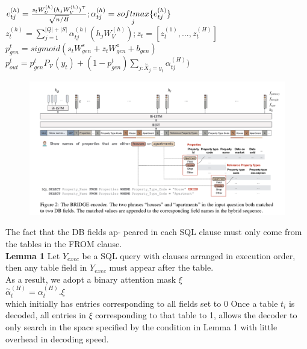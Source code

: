\documentclass[10pt,a4paper]{article}
\begin{document}
\begin{center}
$e_{tj}^{(h)} = \frac{s_{t}W^{(h)}_{U}(h_{j}W^{(h)}_{V})^\top}{\sqrt{n/H}};\space \alpha_{tj}^{(h)}=\underset{j}{softmax}\{e_{tj}^{(h)}\}$\\ 
$z_{t}^{(h)} = \sum^{|Q|+|S|}_{j=1}\alpha_{tj}^{(h)}(h_{j}W^{(h)}_{V});z_{t}=[z_{t}^{(1)},...,z_{t}^{(H)}]$\\
$p^{t}_{gen}=sigmoid(s_{t}W^{s}_{gen}+z_{t}W^{z}_{gen}+b_{gen})$\\
$p^{t}_{out} = p^{t}_{gen}P_{\mathcal{V}}(y_{t})+(1-p^{t}_{gen})\sum_{j: \overset{\sim}{X}_{j}=y_{t}}\alpha_{tj}^{(H)})$
\end{center}
\begin{figure}[htbp] 
\begin{center}
\includegraphics[scale=0.3]{./image/1.png}
\end{center}
\end{figure}
The fact that the DB fields ap-
peared in each SQL clause must only come from
the tables in the FROM clause. \\
\textbf{Lemma 1} Let $Y_{exec}$ be a SQL query with clauses
arranged in execution order, then any table field in
$Y_{exec}$ must appear after the table.\\
As a result, we adopt a binary attention mask $\xi$\\
$\overset{\sim}{\alpha}_{t}^{(H)}=\alpha_{t}^{(H)} . \xi$\\
which initially has entries corresponding to all
fields set to 0 Once a table $t_{i}$ is decoded, 
all entries in $\xi$ corresponding to that table to 1, allows the decoder to only search in the space
specified by the condition in Lemma 1 with little
overhead in decoding speed.
\end{document}
